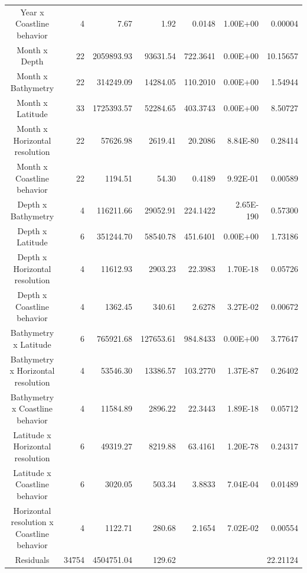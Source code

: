 \begin{table}[H]
\begin{adjustbox}{width=0.9\textwidth}
\begin{tabular}{c|r|r|r|r|r|r}
Year x Coastline behavior	& 
4							& 
7.67						& 
1.92						& 
0.0148						& 
1.00E+00					& 
0.00004						\\
Month x Depth	& 
22				& 
2059893.93		& 
93631.54		& 
722.3641		& 
0.00E+00		& 
10.15657		\\
Month x Bathymetry	& 
22					& 
314249.09			& 
14284.05			& 
110.2010			& 
0.00E+00			& 
1.54944				\\
Month x Latitude		& 
33						& 
1725393.57				& 
52284.65				& 
403.3743				& 
0.00E+00				& 
8.50727					\\
Month x Horizontal resolution	& 
22								& 
57626.98						& 
2619.41							& 
20.2086							& 
8.84E-80						& 
0.28414							\\
Month x Coastline behavior	& 
22							& 
1194.51						& 
54.30						& 
0.4189						& 
9.92E-01					& 
0.00589						\\
Depth x Bathymetry	& 
4					& 
116211.66			& 
29052.91			& 
224.1422			& 
2.65E-190			& 
0.57300				\\
Depth x Latitude		& 
6						& 
351244.70				& 
58540.78				& 
451.6401				& 
0.00E+00				& 
1.73186					\\
Depth x Horizontal resolution	& 
4								& 
11612.93						& 
2903.23							& 
22.3983							& 
1.70E-18						& 
0.05726							\\
Depth x Coastline behavior	& 
4							& 
1362.45						& 
340.61						& 
2.6278						& 
3.27E-02					& 
0.00672						\\
Bathymetry x Latitude	& 
6						& 
765921.68				& 
127653.61				& 
984.8433				& 
0.00E+00				& 
3.77647					\\
Bathymetry x Horizontal resolution	& 
4									& 
53546.30							& 
13386.57							& 
103.2770							& 
1.37E-87							& 
0.26402								\\
Bathymetry x Coastline behavior			& 
4										& 
11584.89								& 
2896.22									& 
22.3443									& 
1.89E-18								& 
0.05712									\\
Latitude x Horizontal resolution	& 
6									& 
49319.27							& 
8219.88								& 
63.4161								& 
1.20E-78							& 
0.24317								\\
Latitude x Coastline behavior	& 
6								& 
3020.05							& 
503.34							& 
3.8833							& 
7.04E-04						& 
0.01489							\\
Horizontal resolution x Coastline   behavior	&
4												& 
1122.71											&
280.68											& 
2.1654											& 
7.02E-02										& 
0.00554											\\
Residuals	&
34754		& 
4504751.04	& 
129.62		&        
			&
			&
22.21124	\\
    \bottomrule
    \end{tabular}
    \end{adjustbox}
    \label{Chap2TabAnovaSimus}
\end{table}

